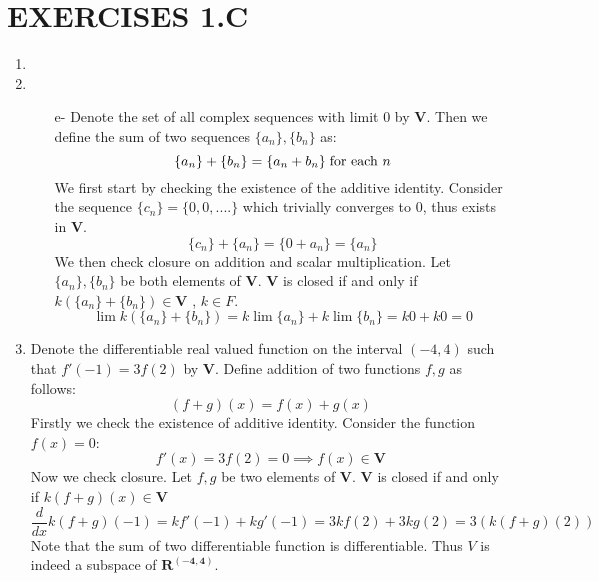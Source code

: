 \documentclass{article}
\begin{document}
\section*{EXERCISES 1.C}
\begin{enumerate}
\item 
\item 
\begin{enumerate}
\item[e-] Denote the set of all complex sequences with limit 0 by $\bm{V}$. Then we define the sum of two sequences $\{a_{n}\}, \{b_{n} \}$ as:
\begin{equation*}
\{a_{n}\} + \{b_{n} \} = \{ a_{n}+b_{n} \} \text{\;for each $n$}
\end{equation*}
We first start by checking the existence of the additive identity. Consider the sequence $\{c_{n}\}= \{0,0,....\}$ which trivially converges to 0, thus exists in $\bm{V}$.
\begin{equation*}
\{c_{n}\} + \{ a_{n}\} = \{0 + a_{n}\} = \{ a_{n}\}
\end{equation*}
We then check closure on addition and scalar multiplication. Let $\{a_{n}\}, \{b_{n}\}$ be both elements of $\bm{V}$. $\bm{V}$ is closed if and only if $k \left(\{a_{n}\} + \{b_{n}\} \right) \in \bm{V}$  , $k \in F$. 
\begin{equation*}
\lim k \left(\{a_{n}\} + \{b_{n}\} \right) = k \lim \{ a_{n}\} + k \lim \{ b_{n}\} = k 0 + k 0 = 0
\end{equation*}
\end{enumerate} 
\item Denote the differentiable real valued function on the interval $(-4,4)$ such that $f'(-1) = 3f(2)$ by $\bm{V}$. Define addition of two functions $f, g$ as follows:
\begin{equation*}
(f+g)(x) = f(x) + g(x) 
\end{equation*}
Firstly we check the existence of additive identity. Consider the function $f(x) = 0$:
\begin{equation*}
f'(x) = 3f(2) = 0 \implies f(x) \in \bm{V}
\end{equation*}
Now we check closure. Let $f,g$ be two elements of $\bm{V}$. $\bm{V}$ is closed if and only if $k(f+g)(x) \in \bm{V}$
\begin{equation*}
\frac{d}{dx} k(f+g)(-1) = kf'(-1) + kg'(-1)= 3kf(2) + 3kg(2) = 3\left(k(f+g)(2)\right)
\end{equation*}
Note that the sum of two differentiable function is differentiable. Thus $V$ is indeed a subspace of $\bm{R^{(-4,4)}}$.

\end{enumerate}
\end{document}
